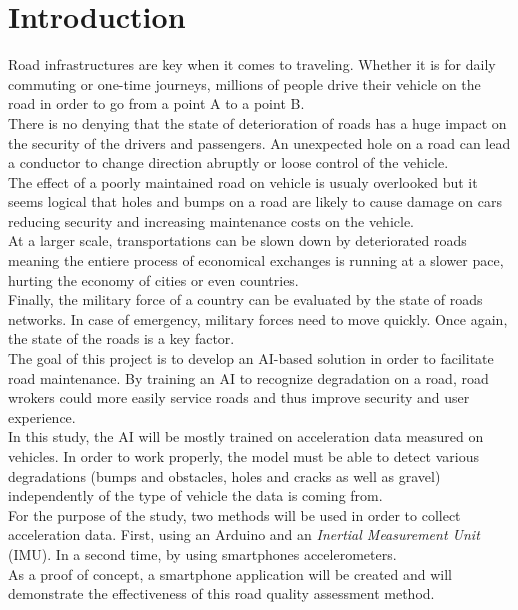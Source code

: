 \section{Introduction}
Road infrastructures are key when it comes to traveling. Whether it is for daily commuting or one-time journeys, millions of people drive their vehicle on the road in order to go from a point A to a point B.\\
There is no denying that the state of deterioration of roads has a huge impact on the security of the drivers and passengers. An unexpected hole on a road can lead a conductor to change direction abruptly or loose control of the vehicle.\\
The effect of a poorly maintained road on vehicle is usualy overlooked but it seems logical that holes and bumps on a road are likely to cause damage on cars reducing security and increasing maintenance costs on the vehicle.\\
At a larger scale, transportations can be slown down by deteriorated roads meaning the entiere process of economical exchanges is running at a slower pace, hurting the economy of cities or even countries.\\
Finally, the military force of a country can be evaluated by the state of roads networks. In case of emergency, military forces need to move quickly. Once again, the state of the roads is a key factor.\\

The goal of this project is to develop an AI-based solution in order to facilitate road maintenance. By training an AI to recognize degradation on a road, road wrokers could more easily service roads and thus improve security and user experience.\\
In this study, the AI will be mostly trained on acceleration data measured on vehicles. In order to work properly, the model must be able to detect various degradations (bumps and obstacles, holes and cracks as well as gravel) independently of the type of vehicle the data is coming from.\\
For the purpose of the study, two methods will be used in order to collect acceleration data. First, using an Arduino and an \textit{Inertial Measurement Unit} (IMU). In a second time, by using smartphones accelerometers.
\\
As a proof of concept, a smartphone application will be created and will demonstrate the effectiveness of this road quality assessment method.\\